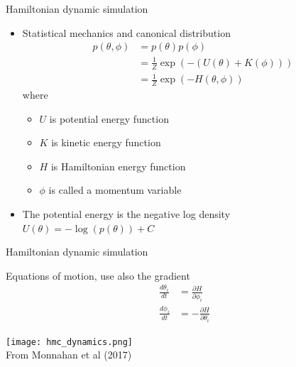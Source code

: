\documentclass[finnish,english,t]{beamer}
\begin{document}
\begin{frame}{Hamiltonian dynamic simulation}

  \begin{itemize}
  \item Statistical mechanics and canonical distribution
    \begin{align*}
      p(\theta,\phi)&=p(\theta)p(\phi)\\
      &=\frac{1}{Z}\exp(-(U(\theta)+K(\phi)))\\
      &=\frac{1}{Z}\exp(-H(\theta,\phi))
    \end{align*}
    where
    \begin{itemize}
    \item $U$ is potential energy function
    \item $K$ is kinetic energy function
    \item $H$ is Hamiltonian energy function
    \item $\phi$ is called a momentum variable
    \end{itemize}
  \item<2-> The potential energy is the negative log density\\
    $U(\theta)=-\log(p(\theta))+C$
  \end{itemize}
  
  
\end{frame}

\begin{frame}{Hamiltonian dynamic simulation}

 Equations of motion, use also the gradient
  \begin{align*}
    \frac{d\theta_i}{dt} & = \frac{\partial H}{\partial \phi_i}\\
    \frac{d\phi_i}{dt} & = -\frac{\partial H}{\partial \theta_i}
  \end{align*}

  \texttt{[image: hmc\_dynamics.png]}
  \\
  {\footnotesize From Monnahan et al (2017)}
  
\end{frame}
\end{document}
